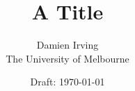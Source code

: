 \documentclass[a4paper,12pt]{article}
\begin{document}
\title{A Title}

\author{Damien Irving\\ The University of Melbourne }

\date{Draft: \today}



\maketitle 


%       
\end{document}
